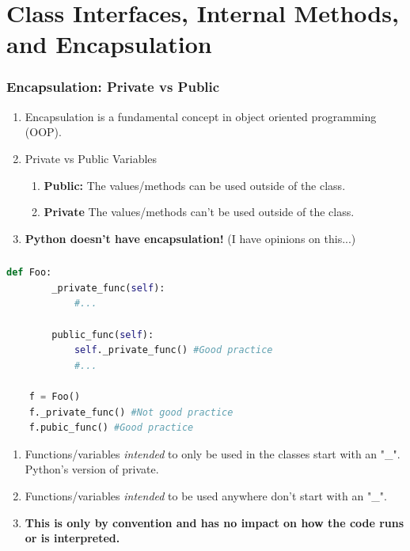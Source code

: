 \documentclass{beamer}
\begin{document}
\section{Class Interfaces, Internal Methods, and Encapsulation}

%
%
\begin{frame}[fragile]
    \frametitle{Encapsulation: Private vs Public}
    \vfill
    \begin{enumerate}[A]
        \item Encapsulation is a fundamental concept in object oriented programming (OOP).
        \item Private vs Public Variables
        \begin{enumerate}[A]
            \item \textbf{Public: } The values/methods can be used outside of the class.
            \item \textbf{Private } The values/methods can't be used outside of the class.
        \end{enumerate}
    \item \textbf{Python doesn't have encapsulation!} (I have opinions on this...)
    \end{enumerate}
    \vfill
\end{frame}

%
%
\begin{frame}[fragile]
    \frametitle{}
    \begin{lstlisting}[language=Python, autogobble]
    def Foo:
        _private_func(self):
            #...

        public_func(self):
            self._private_func() #Good practice
            #...

    f = Foo()
    f._private_func() #Not good practice
    f.pubic_func() #Good practice
    \end{lstlisting}
    \vfill
    \begin{enumerate}[A]
        \item Functions/variables \textit{intended} to only be used in the classes start with an "\_". Python's version of private.
        \item Functions/variables \textit{intended} to be used anywhere don't start with an "\_".
        \item \textbf{This is only by convention and has no impact on how the code runs or is interpreted.}
    \end{enumerate}
\end{frame}
\end{document}
